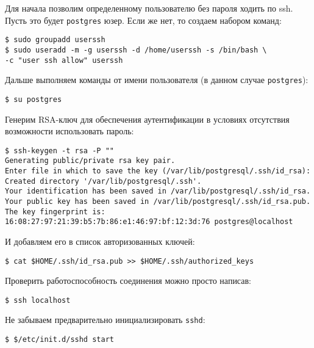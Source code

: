 Для начала позволим определенному пользователю без пароля ходить по ssh. Пусть это будет \lstinline!postgres! юзер. Если же нет, то создаем набором команд:

\begin{lstlisting}[label=lst:streaming1,caption=Создаем пользователя userssh]
$ sudo groupadd userssh
$ sudo useradd -m -g userssh -d /home/userssh -s /bin/bash \
-c "user ssh allow" userssh
\end{lstlisting}

Дальше выполняем команды от имени пользователя (в данном случае \lstinline!postgres!):

\begin{lstlisting}[label=lst:streaming2,caption=Логинимся под пользователем postgres]
$ su postgres
\end{lstlisting}

Генерим RSA-ключ для обеспечения аутентификации в условиях отсутствия возможности использовать пароль:

\begin{lstlisting}[label=lst:streaming3,caption=Генерим RSA-ключ]
$ ssh-keygen -t rsa -P ""
Generating public/private rsa key pair.
Enter file in which to save the key (/var/lib/postgresql/.ssh/id_rsa):
Created directory '/var/lib/postgresql/.ssh'.
Your identification has been saved in /var/lib/postgresql/.ssh/id_rsa.
Your public key has been saved in /var/lib/postgresql/.ssh/id_rsa.pub.
The key fingerprint is:
16:08:27:97:21:39:b5:7b:86:e1:46:97:bf:12:3d:76 postgres@localhost
\end{lstlisting}

И добавляем его в список авторизованных ключей:

\begin{lstlisting}[label=lst:streaming4,caption=Добавляем его в список авторизованных ключей]
$ cat $HOME/.ssh/id_rsa.pub >> $HOME/.ssh/authorized_keys
\end{lstlisting}

Проверить работоспособность соединения можно просто написав:

\begin{lstlisting}[label=lst:streaming5,caption=Пробуем зайти на ssh без пароля]
$ ssh localhost
\end{lstlisting}

Не забываем предварительно инициализировать \lstinline!sshd!:

\begin{lstlisting}[label=lst:streaming6,caption=Запуск sshd]
$ $/etc/init.d/sshd start
\end{lstlisting}

